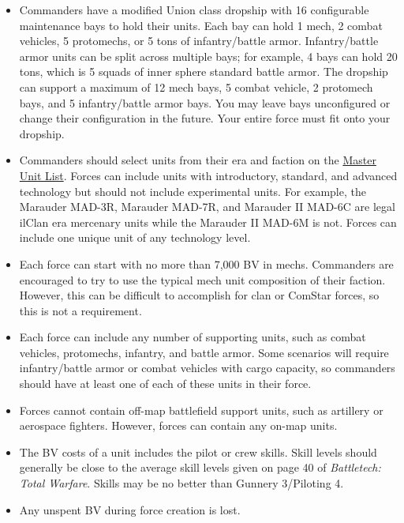 \documentclass[UTF8]{article}
\begin{document}
\begin{itemize}

\item Commanders have a modified Union class dropship with 16 configurable maintenance bays to hold their units.
Each bay can hold 1 mech, 2 combat vehicles, 5 protomechs, or 5 tons of infantry/battle armor.
Infantry/battle armor units can be split across multiple bays; for example, 4 bays can hold 20 tons, which is 5 squads of inner sphere standard battle armor.
The dropship can support a maximum of 12 mech bays, 5 combat vehicle, 2 protomech bays, and 5 infantry/battle armor bays.
You may leave bays unconfigured or change their configuration in the future.
Your entire force must fit onto your dropship.

\item Commanders should select units from their era and faction on the \href{http://www.masterunitlist.info/}{Master Unit List}.
Forces can include units with introductory, standard, and advanced technology but should not include experimental units.
For example, the Marauder MAD-3R, Marauder MAD-7R, and Marauder II MAD-6C are legal ilClan era mercenary units while the Marauder II MAD-6M is not.
Forces can include one unique unit of any technology level.

\item Each force can start with no more than 7,000 BV in mechs.
Commanders are encouraged to try to use the typical mech unit composition of their faction.
However, this can be difficult to accomplish for clan or ComStar forces, so this is not a requirement.

\item Each force can include any number of supporting units, such as combat vehicles, protomechs, infantry, and battle armor.
Some scenarios will require infantry/battle armor or combat vehicles with cargo capacity, so commanders should have at least one of each of these units in their force.

\item Forces cannot contain off-map battlefield support units, such as artillery or aerospace fighters.
However, forces can contain any on-map units.

\item The BV costs of a unit includes the pilot or crew skills.
Skill levels should generally be close to the average skill levels given on page 40 of \emph{Battletech: Total Warfare}.
Skills may be no better than Gunnery 3/Piloting 4.

\item Any unspent BV during force creation is lost.

\end{itemize}
\end{document}
